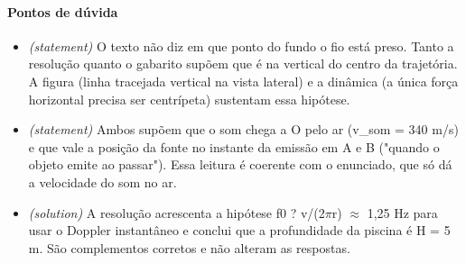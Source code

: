 \documentclass{article}%
\begin{document}
\paragraph{Pontos de dúvida}%
\begin{itemize}%
\item%
\textit{(statement)} O texto não diz em que ponto do fundo o fio está preso. Tanto a resolução quanto o gabarito supõem que é na vertical do centro da trajetória. A figura (linha tracejada vertical na vista lateral) e a dinâmica (a única força horizontal precisa ser centrípeta) sustentam essa hipótese.%
\item%
\textit{(statement)} Ambos supõem que o som chega a O pelo ar (v\_som = 340 m/s) e que vale a posição da fonte no instante da emissão em A e B ("quando o objeto emite ao passar"). Essa leitura é coerente com o enunciado, que só dá a velocidade do som no ar.%
\item%
\textit{(solution)} A resolução acrescenta a hipótese f0 ? v/(2$\pi$r) $\approx$ 1,25 Hz para usar o Doppler instantâneo e conclui que a profundidade da piscina é H = 5 m. São complementos corretos e não alteram as respostas.%
\end{itemize}%
\end{document}
